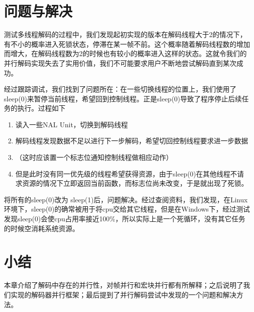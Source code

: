 \section{问题与解决}
\label{sec:parallelbuganddebug}

测试多线程解码的过程中，我们发现起初实现的版本在解码线程大于2的情况下，有不小的概率进入死锁状态，停滞在某一帧不前。这个概率随着解码线程数的增加而增大，在解码线程数为2的时候也有较小的概率进入这样的状态。这就令我们的并行解码实现失去了实用价值，我们不可能要求用户不断地尝试解码直到某次成功。

经过跟踪调试，我们找到了问题所在：在一些切换线程的位置上，我们使用了sleep(0)来暂停当前线程，希望回到控制线程。正是sleep(0)导致了程序停止后续任务的执行。过程如下
\begin{enumerate}
\item 读入一些NAL Unit，切换到解码线程
\item 解码线程发现数据不足以进行下一步解码，希望切回控制线程要求进一步数据
\item （这时应该置一个标志位通知控制线程做相应动作）
\item 但是此时没有同一优先级的线程希望获得资源，由于sleep(0)在其他线程不请求资源的情况下立即返回当前函数，而标志位尚未改变，于是就出现了死锁。
\end{enumerate}

将所有的sleep(0)改为 sleep(1)后，问题解决。经过查阅资料，我们发现，在Linux环境下，sleep(0)的确常被用于将cpu交给其它线程，但是在Windows下，经过测试发现sleep(0)会使cpu占用率接近100\%，所以实际上是一个死循环，没有其它任务的时候空消耗系统资源。

\section{小结}
\label{sec:sum5}

本章介绍了解码中存在的并行性，对帧并行和宏块并行都有所解释；之后说明了我们实现的解码器并行框架；最后提到了并行解码尝试中发现的一个问题和解决方法。


